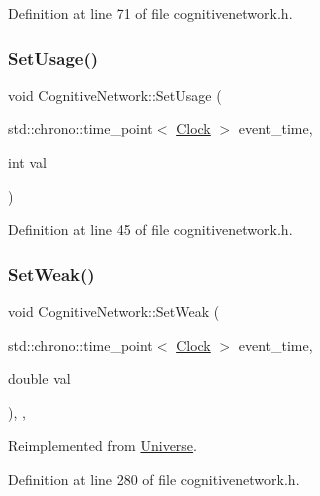 Definition at line 71 of file cognitivenetwork.\+h.

\mbox{\label{class_cognitive_network_a8b6b4afc47df279604be13bce77f5b0a}} 
\subsubsection{\texorpdfstring{Set\+Usage()}{SetUsage()}}
{\footnotesize\ttfamily void Cognitive\+Network\+::\+Set\+Usage (\begin{DoxyParamCaption}\item[{std\+::chrono\+::time\+\_\+point$<$ \hyperlink{universe_8h_a0ef8d951d1ca5ab3cfaf7ab4c7a6fd80}{Clock} $>$}]{event\+\_\+time,  }\item[{int}]{val }\end{DoxyParamCaption})\hspace{0.3cm}{\ttfamily [inline]}}



Definition at line 45 of file cognitivenetwork.\+h.

\mbox{\label{class_cognitive_network_ab39c9eed50da6d3630c4498ae64b804e}} 
\subsubsection{\texorpdfstring{Set\+Weak()}{SetWeak()}}
{\footnotesize\ttfamily void Cognitive\+Network\+::\+Set\+Weak (\begin{DoxyParamCaption}\item[{std\+::chrono\+::time\+\_\+point$<$ \hyperlink{universe_8h_a0ef8d951d1ca5ab3cfaf7ab4c7a6fd80}{Clock} $>$}]{event\+\_\+time,  }\item[{double}]{val }\end{DoxyParamCaption})\hspace{0.3cm}{\ttfamily [inline]}, {\ttfamily [final]}, {\ttfamily [virtual]}}



Reimplemented from \hyperlink{class_universe_a0f5cd04081b41ee931c0557dc397f6fb}{Universe}.



Definition at line 280 of file cognitivenetwork.\+h.


